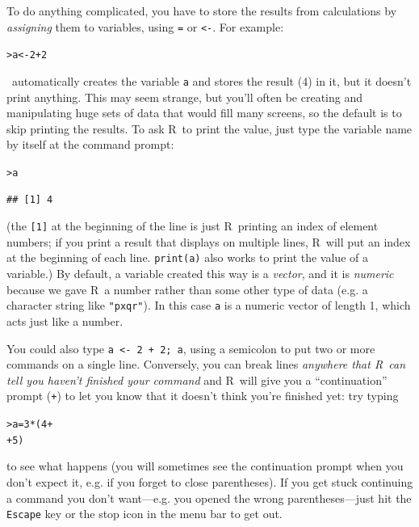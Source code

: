 \documentclass[11pt]{article}\usepackage[]{graphicx}\usepackage[]{color}
\makeatletter
\newcommand{\hlnum}[1]{\textcolor[rgb]{0.686,0.059,0.569}{#1}}%
\newcommand{\hlopt}[1]{\textcolor[rgb]{0,0,0}{#1}}%
\newcommand{\hlstd}[1]{\textcolor[rgb]{0.345,0.345,0.345}{#1}}%
\newcommand{\hlkwb}[1]{\textcolor[rgb]{0.69,0.353,0.396}{#1}}%
\newenvironment{kframe}{%
 \def\at@end@of@kframe{}%
 \ifinner\ifhmode%
  \def\at@end@of@kframe{\end{minipage}}%
  \begin{minipage}{\columnwidth}%
 \fi\fi%
 \def\FrameCommand##1{\hskip\@totalleftmargin \hskip-\fboxsep
 \colorbox{shadecolor}{##1}\hskip-\fboxsep
     \hskip-\linewidth \hskip-\@totalleftmargin \hskip\columnwidth}%
 \MakeFramed {\advance\hsize-\width
   \@totalleftmargin\z@ \linewidth\hsize
   \@setminipage}}%
 {\par\unskip\endMakeFramed%
 \at@end@of@kframe}
\newenvironment{knitrout}{}{} %
\newcommand{\code}[1]{{\tt #1}}
\newcommand\R{{\sf R}}
\numberwithin{exercise}{section}
\makeatother
\begin{document}
To do anything complicated, you have to store the results from
calculations by \emph{assigning} them to variables, using \code{=} or
\verb+<-+. For example:
\begin{knitrout}
\color{fgcolor}\begin{kframe}
\begin{alltt}
\hlstd{> }\hlstd{a} \hlkwb{<-} \hlnum{2} \hlopt{+} \hlnum{2}
\end{alltt}
\end{kframe}
\end{knitrout}
\noindent \R\ automatically creates the variable \code{a} and stores the result (4)
in it, but it doesn't print anything.  This may seem strange, but you'll
often be creating and manipulating huge sets of data that would fill
many screens, so the default is to skip printing the results.
To ask \R\ to print the value, just type the variable name by itself
at the command prompt:
\begin{knitrout}
\color{fgcolor}\begin{kframe}
\begin{alltt}
\hlstd{> }\hlstd{a}
\end{alltt}
\begin{verbatim}
## [1] 4
\end{verbatim}
\end{kframe}
\end{knitrout}
\noindent (the \code{[1]} at the beginning of the line is just \R\ printing
an index of element numbers; if you print a result that
displays on multiple lines, \R\ will put an index at the beginning
of each line.  \code{print(a)} also works to print the value of
a variable.)  By default, a variable created this way is a \emph{vector}, 
and it is \emph{numeric} because we gave \R\ a number rather
than some other type of data (e.g. a character string like \code{"pxqr"}).
In this case \code{a} is a numeric vector of length 1,
which acts just like a number. 

You could also type \code{a <- 2 + 2; a},
using a semicolon to put two or more commands on a single line.
Conversely, you can break lines \emph{anywhere that \R\ can tell you haven't
finished your command} and \R\ will give you a ``continuation'' prompt
(\code{+}) to let you know that it doesn't think you're finished yet: try typing
\begin{knitrout}
\color{fgcolor}\begin{kframe}
\begin{alltt}
\hlstd{> }\hlstd{a} \hlkwb{=} \hlnum{3} \hlopt{*} \hlstd{(}\hlnum{4} \hlopt{+}
\hlstd{+  }\hlnum{5}\hlstd{)}
\end{alltt}
\end{kframe}
\end{knitrout}
\noindent to see what happens (you will sometimes see the continuation prompt
when you don't expect it, e.g. if you forget to close parentheses).
If you get stuck continuing a command you don't want---e.g. you opened
the wrong parentheses---just hit the \code{Escape} key or the stop
icon in the menu bar to get out.
\end{document}
